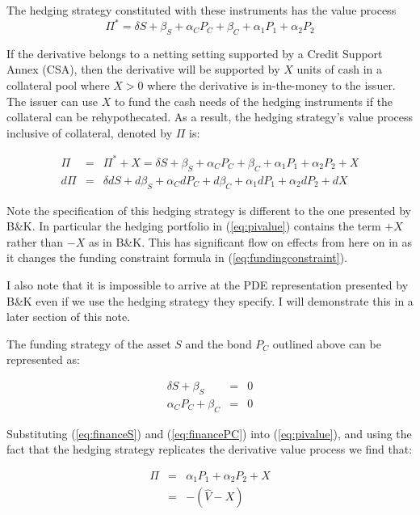 \documentclass{tufte-handout}
\begin{document}
The hedging strategy constituted with these instruments has the value process
\begin{equation}
  \Pi^* = \delta S + \beta_S + \alpha_C P_C + \beta_C + \alpha_1 P_1 + \alpha_2 P_2
\end{equation}

If the derivative belongs to a netting setting supported by a Credit Support
Annex (CSA), then the derivative will be supported by $X$ units of cash in
a collateral pool where $X>0$ where the derivative is in-the-money to the issuer.
The issuer can use $X$ to fund the cash needs of the hedging instruments if
the collateral can be rehypothecated. As a result, the hedging strategy's value
process inclusive of collateral, denoted by $\Pi$ is:

\begin{eqnarray}
  \Pi & = & \Pi^* + X = \delta S + \beta_S + \alpha_C P_C + \beta_C +
          \alpha_1 P_1 + \alpha_2 P_2 + X \label{eq:pivalue} \\
  d\Pi & = & \delta dS + d\beta_S + \alpha_C dP_C + d\beta_C +
          \alpha_1 dP_1 + \alpha_2 dP_2 + dX \label{eq:pidelta}
\end{eqnarray}

Note the specification of this hedging strategy is different to the one
presented by B\&K. In particular the hedging portfolio in (\ref{eq:pivalue})
contains the term $+X$ rather than $-X$ as in B\&K. This has significant flow on effects
from here on in as it changes the funding constraint formula in (\ref{eq:fundingconstraint}).

I also note that it is impossible to arrive at the PDE representation presented
by B\&K even if we use the hedging strategy they specify. I will
demonstrate this in a later section of this note.

The funding strategy of the asset $S$ and the bond $P_C$ outlined above can be
represented as:

\begin{eqnarray}
  \delta S + \beta_S & = & 0 \label{eq:financeS} \\
  \alpha_C P_C + \beta_C & = & 0 \label{eq:financePC}
\end{eqnarray}

Substituting (\ref{eq:financeS}) and (\ref{eq:financePC}) into (\ref{eq:pivalue}),
and using the fact that the hedging strategy replicates the derivative value
process we find that:

\begin{eqnarray*}
  \Pi & = & \alpha_1 P_1 + \alpha_2 P_2 + X \\
      & = & -(\hat{V} - X)
\end{eqnarray*}
\end{document}
